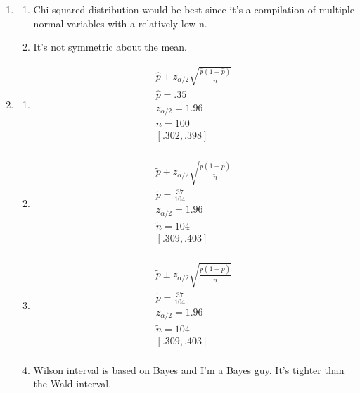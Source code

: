 \documentclass{article}
\begin{document}
\begin{enumerate}
\item
	\begin{enumerate}
	\item
Chi squared distribution would be best since it's a compilation of multiple normal variables with a relatively low n.
	\item
It's not symmetric about the mean.
	\end{enumerate}
\item
	\begin{enumerate}
	\item
	\begin{equation*}
	\begin{split}
	\hat{p} \pm z_{\alpha/2} \sqrt{\frac{\hat{p}(1-\hat{p})}{n} } \\
	\hat{p} = .35 \\
	z_{\alpha/2} = 1.96 \\
	n = 100 \\
	[.302,.398] \\
	\end{split}
	\end{equation*}
	\item
	\begin{equation*}
	\begin{split}
	\tilde{p} \pm z_{\alpha/2} \sqrt{\frac{\tilde{p}(1-\tilde{p})}{\tilde{n}} } \\
	\tilde{p} = \frac{37}{104} \\
	z_{\alpha/2} = 1.96 \\
	\tilde{n} = 104 \\
	[.309,.403] \\
	\end{split}
	\end{equation*}
	\item
	\begin{equation*}
	\begin{split}
	\tilde{p} \pm z_{\alpha/2} \sqrt{\frac{\tilde{p}(1-\tilde{p})}{\tilde{n}} } \\
	\tilde{p} = \frac{37}{104} \\
	z_{\alpha/2} = 1.96 \\
	\tilde{n} = 104 \\
	[.309,.403] \\
	\end{split}
	\end{equation*}
	\item
	Wilson interval is based on Bayes and I'm a Bayes guy. It's tighter than the Wald interval. 
	\end{enumerate}

\end{enumerate}
\end{document}
